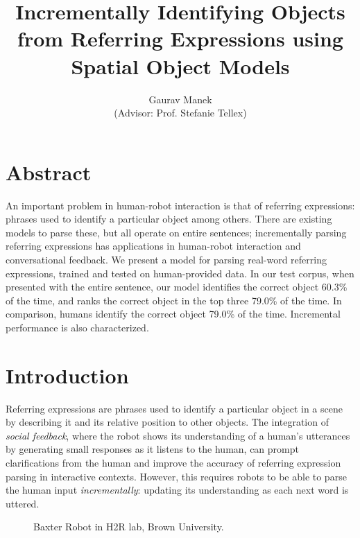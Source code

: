 \documentclass[conference]{IEEEtran}
\title{Incrementally Identifying Objects from Referring Expressions using Spatial Object Models}
\author{Gaurav Manek\\(Advisor: Prof. Stefanie Tellex)}
\numberwithin{equation}{section}
\begin{document}
\maketitle

\section{Abstract}
An important problem in human-robot interaction is that of referring expressions: phrases used to identify a particular object among others. There are existing models to parse these, but all operate on entire sentences; incrementally parsing referring expressions has applications in human-robot interaction and conversational feedback. We present a model for parsing real-word referring expressions, trained and tested on human-provided data. In our test corpus, when presented with the entire sentence, our model identifies the correct object 60.3\% of the time, and ranks the correct object in the top three 79.0\% of the time. In comparison, humans identify the correct object 79.0\% of the time. Incremental performance is also characterized.


\section{Introduction}

Referring expressions are phrases used to identify a particular object in a scene by describing it and its relative position to other objects. The integration of \emph{social feedback}, where the robot shows its understanding of a human's utterances by generating small responses as it listens to the human, can prompt clarifications from the human and improve the accuracy of referring expression parsing in interactive contexts. However, this requires robots to be able to parse the human input \emph{incrementally}: updating its understanding as each next word is uttered. 


\begin{figure}[!tb]
  \centering
  \label{fig:robot}

  \caption{Baxter Robot in H2R lab, Brown University.}
\end{figure}
\end{document}

